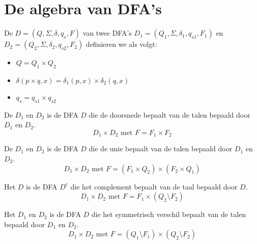 \documentclass[main.tex]{subfiles}
\begin{document}


\section{De algebra van DFA's}
\label{sec:de-algebra-van-DFAs}

\begin{de}
  De  $D = (Q,\Sigma, \delta, q_{s},F)$ van twee DFA's $D_{1} = (Q_{1},\Sigma, \delta_{1}, q_{s1},F_{1})$ en $D_{2} = (Q_{2},\Sigma, \delta_{2}, q_{s2},F_{2})$ definieren we als volgt:
  \begin{itemize}
  \item $Q = Q_{1}\times Q_{2}$
  \item $\delta(p\times q,x) = \delta_{1}(p,x) \times \delta_{2}(q,x)$
  \item $q_{s} = q_{s1} \times q_{s2}$
  \end{itemize}
\end{de}

\begin{de}
  De  $D_{1}$ en $D_{2}$ is de DFA $D$ die de doorsnede bepaalt van de talen bepaald door $D_{1}$ en $D_{2}$.
  \[ D_{1} \times D_{2} \text{ met } F = F_{1} \times F_{2} \]
\end{de}

\begin{de}
  De  $D_{1}$ en $D_{2}$ is de DFA $D$ die de unie bepaalt van de talen bepaald door $D_{1}$ en $D_{2}$.
  \[ D_{1} \times D_{2} \text{ met } F = (F_{1}\times Q_{2}) \times (F_{2} \times Q_{1}) \]
\end{de}

\begin{de}
  Het  $D$ is de DFA $D^{c}$ die het complement bepaalt van de taal bepaald door $D$.
  \[ D_{1} \times D_{2} \text{ met } F = F_{1} \times (Q_{2}\setminus F_{2}) \]
\end{de}

\begin{de}
  Het  $D_{1}$ en $D_{2}$ is de DFA $D$ die het symmetrisch verschil bepaalt van de talen bepaald door $D_{1}$ en $D_{2}$.
  \[ D_{1} \times D_{2} \text{ met } F = (Q_{1}\setminus F_{1}) \times (Q_{2}\setminus F_{2}) \]
\end{de}




\end{document}
